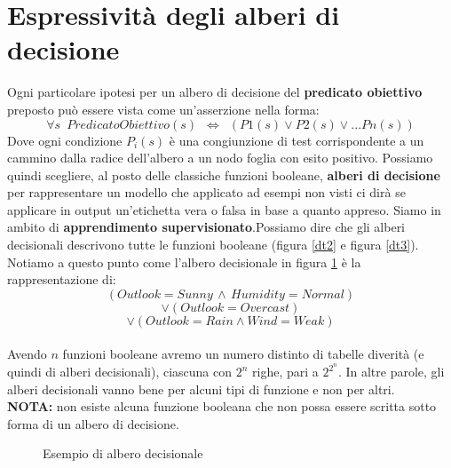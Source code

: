 \section{Espressività degli alberi di decisione}
Ogni particolare ipotesi per un albero di decisione del \textbf{predicato obiettivo} preposto può essere vista come un'asserzione nella forma:
\[\forall s\,\,\, PredicatoObiettivo(s)\,\,\,\iff\,\,\,(P1(s)\vee P2(s)  \vee ... Pn(s))\]
Dove ogni condizione $P_i(s)$ è una congiunzione di test corrispondente a un cammino dalla radice dell'albero a un nodo foglia con esito positivo.
Possiamo quindi scegliere, al posto delle classiche funzioni booleane,
\textbf{alberi di decisione} per rappresentare un modello che applicato ad
esempi non visti ci dirà se applicare in output un'etichetta vera o falsa in
base a quanto appreso. Siamo in ambito di \textbf{apprendimento
  supervisionato}.Possiamo dire che gli alberi decisionali descrivono tutte le funzioni booleane (figura \ref{dt2} e figura \ref{dt3}). 
Notiamo a questo punto come l'albero decisionale in figura \ref{dt} è la
rappresentazione di:
\[(Outlook=Sunny\,\land\, Humidity=Normal)\]
\[\lor(Outlook=Overcast)\]
\[\lor(Outlook=Rain \land Wind=Weak) \] \\ Avendo $n$ funzioni booleane avremo un numero distinto di tabelle diverità (e quindi di alberi decisionali), ciascuna con $2^n$ righe, pari a $2^{2^{n}}$. In altre parole, gli alberi decisionali vanno bene per alcuni tipi di funzione e non per altri.\\
  \textbf{NOTA:} non esiste alcuna funzione booleana che non possa essere scritta sotto forma di un albero di decisione.\\
\begin{figure}
  \centering
  \caption{Esempio di albero decisionale}
  \label{dt}
\end{figure}

